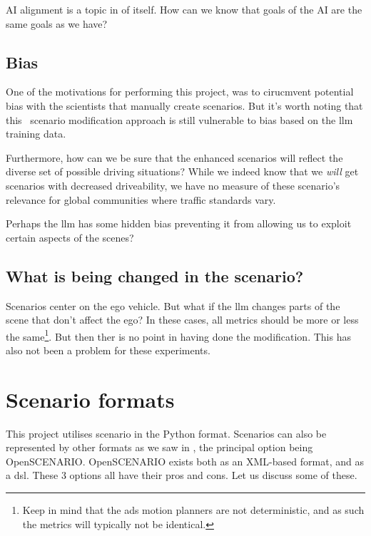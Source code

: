 AI alignment is a topic in of itself. How can we know that goals of the AI are the same goals as we
have?

\subsection{Bias}

One of the motivations for performing this project, was to cirucmvent potential bias with the
scientists that manually create scenarios. But it's worth noting that this \hefe~scenario
modification approach is still vulnerable to bias based on the \acrshort{llm} training data.

Furthermore, how can we be sure that the enhanced scenarios will reflect the diverse set of possible
driving situations? While we indeed know that we \emph{will} get scenarios with decreased
driveability, we have no measure of these scenario's relevance for global communities where traffic
standards vary.

Perhaps the \acrshort{llm} has some hidden bias preventing it from allowing us to exploit certain
aspects of the scenes?

\subsection{What is being changed in the scenario?}

Scenarios center on the ego vehicle. But what if the \acrshort{llm} changes parts of the scene that
don't affect the ego? In these cases, all metrics should be more or less the same\footnote{Keep in
    mind that the \acrshort{ads} motion planners are not deterministic, and as such the metrics will typically
    not be identical.}. But then ther is no point in having done the modification. This has also not
been a problem for these experiments.

\section{Scenario formats}

This project utilises scenario in the Python format. Scenarios can also be represented by other
formats as we saw in , the principal option being OpenSCENARIO.
OpenSCENARIO exists both as an XML-based format, and as a \acrfull{dsl}. These \num{3} options all
have their pros and cons. Let us discuss some of these.

